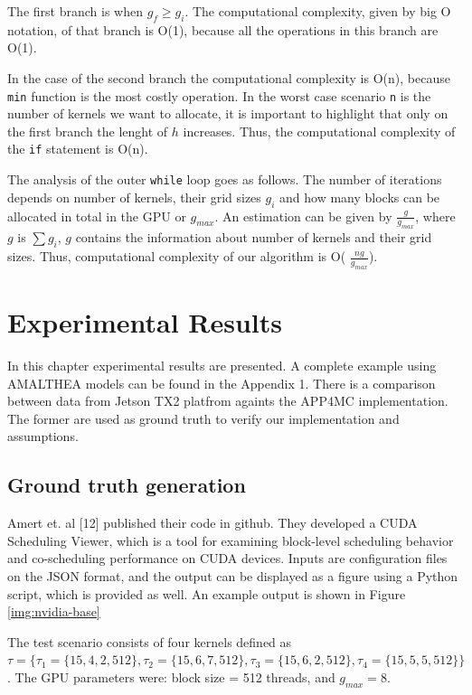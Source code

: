 \documentclass[
  12pt,
  a4paperpaper,
]{report}
\begin{document}
The first branch is when \(g_f \geq g_i\). The computational complexity,
given by big O notation, of that branch is O(1), because all the
operations in this branch are O(1).

In the case of the second branch the computational complexity is O(n),
because \texttt{min} function is the most costly operation. In the worst
case scenario \texttt{n} is the number of kernels we want to allocate,
it is important to highlight that only on the first branch the lenght of
\(h\) increases. Thus, the computational complexity of the \texttt{if}
statement is O(n).

The analysis of the outer \texttt{while} loop goes as follows. The number of iterations
depends on number of kernels, their grid sizes \(g_i\) and how many
blocks can be allocated in total in the GPU or \(g_{max}\). An
estimation can be given by \(\frac{g}{g_{max}}\), where \(g\) is
\(\sum g_i\), \(g\) contains the information about number of kernels and
their grid sizes. Thus, computational complexity of our algorithm is O(
\(\frac{ng}{g_{max}}\)).

\hypertarget{experimental-results}{%
\chapter{Experimental Results}\label{experimental-results}}

In this chapter experimental results are presented. A complete example
using AMALTHEA models can be found in the Appendix 1. There is a comparison 
between data from Jetson TX2 platfrom againts the APP4MC implementation. The former
are used as ground truth to verify our implementation and assumptions.

\hypertarget{ground-truth-generation}{%
\section{Ground truth generation}\label{ground-truth-generation}}

Amert et. al {[}12{]} published their code in github. They developed a
CUDA Scheduling Viewer, which is a tool for examining block-level
scheduling behavior and co-scheduling performance on CUDA devices. 
Inputs are configuration files on the JSON format, and the output can be
displayed as a figure using a Python script, which is provided as well. An
example output is shown in Figure \ref{img:nvidia-base}

The test scenario consists of four kernels defined as \(\tau = \{\tau_1 = \{15, 4, 2, 512\} , \tau_2 = \{15, 6,7,512\}, \tau_3 = \{15, 6,2,512\}, \tau_4 =\{ 15, 5,5,512\} \}\).
The GPU parameters were: block size = 512 threads, and \(g_{max} = 8\).
\end{document}

